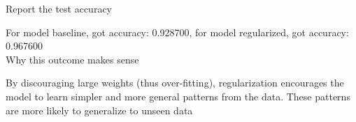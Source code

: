 \begin{answer}

Report the test accuracy

For model baseline, got accuracy: 0.928700, for model regularized, got accuracy: 0.967600 \\ 

Why this outcome makes sense 

By discouraging large weights (thus over-fitting), regularization encourages the model to learn simpler and more general patterns from the data. These patterns are more likely to generalize to unseen data
\end{answer}
   
  
